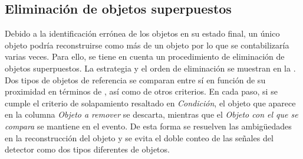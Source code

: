 \subsection{Eliminación de objetos superpuestos}
\label{subsec:evt_selection:presel:or}

Debido a la identificación errónea de los objetos en su estado final, un único objeto podría reconstruirse como más de un objeto por lo que se contabilizaría varias veces. Para ello, se tiene en cuenta un procedimiento de eliminación de objetos superpuestos. La estrategia y el orden de eliminación se muestran en la \Tab{\ref{tab:evt_selection:presel:or}}. Dos tipos de objetos de referencia se comparan entre sí en función de su proximidad en términos de \DeltaR, así como de otros criterios. En cada paso, si se cumple el criterio de solapamiento resaltado en \textit{Condición}, el objeto que aparece en la columna \textit{Objeto a remover} se descarta, mientras que el \textit{Objeto con el que se compara} se mantiene en el evento. De esta forma se resuelven las ambigüedades en la reconstrucción del objeto y se evita el doble conteo de las señales del detector como dos tipos diferentes de objetos.

\begin{table}[ht!]
    \centering
    \caption{Pasos para la eliminación de objetos superpuestos.}
    \label{tab:evt_selection:presel:or}
\end{table}










